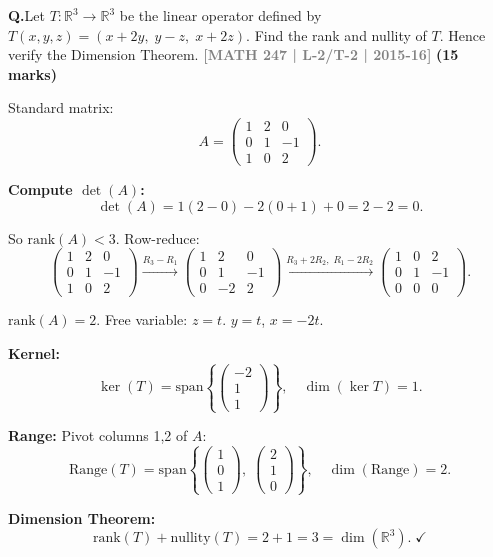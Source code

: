 \documentclass[12pt,a3paper]{article}
\newcommand{\yr}[1]{\hfill\textcolor{gray}{\small\textbf{[#1]}}}
\newcommand{\mk}[1]{\textcolor{orange!70!black}{\small\textbf{(#1 marks)}}}
\newcounter{qnum}
\newcommand{\Q}[1]{%
  \needspace{4\baselineskip}
  \refstepcounter{qnum}
  \vspace{6pt}
  \noindent\textbf{Q\theqnum.}\enspace #1\par
}
\begin{document}
\Q{Let $T: \mathbb{R}^3 \to \mathbb{R}^3$ be the linear operator defined by $T(x,y,z) = (x+2y,\; y-z,\; x+2z)$. Find the rank and nullity of $T$. Hence verify the Dimension Theorem.
\yr{MATH 247 | L-2/T-2 | 2015-16} \mk{15}}

\begin{tcolorbox}[enhanced,breakable,
  colback=cF!4,colframe=cF,boxrule=0.8pt,arc=5pt,
  title={\textbf{Answer --- $T(x,y,z)=(x+2y,\;y-z,\;x+2z)$: Rank, Nullity, Dimension Theorem}},
  fonttitle=\bfseries\color{white},colbacktitle=cF]

Standard matrix:
\[
A=\begin{pmatrix}1&2&0\\0&1&-1\\1&0&2\end{pmatrix}.
\]

\textbf{Compute $\det(A)$:}
\[
\det(A)=1(2-0)-2(0+1)+0=2-2=0.
\]

So $\mathrm{rank}(A)<3$. Row-reduce:
\[
\begin{pmatrix}1&2&0\\0&1&-1\\1&0&2\end{pmatrix}
\xrightarrow{R_3-R_1}
\begin{pmatrix}1&2&0\\0&1&-1\\0&-2&2\end{pmatrix}
\xrightarrow{R_3+2R_2,\;R_1-2R_2}
\begin{pmatrix}1&0&2\\0&1&-1\\0&0&0\end{pmatrix}.
\]

$\mathrm{rank}(A)=2$. Free variable: $z=t$. $y=t$, $x=-2t$.

\textbf{Kernel:}
\[
\ker(T)=\mathrm{span}\!\left\{\begin{pmatrix}-2\\1\\1\end{pmatrix}\right\},\quad\dim(\ker T)=1.
\]

\textbf{Range:} Pivot columns 1,2 of $A$:
\[
\mathrm{Range}(T)=\mathrm{span}\!\left\{\begin{pmatrix}1\\0\\1\end{pmatrix},\;\begin{pmatrix}2\\1\\0\end{pmatrix}\right\},\quad\dim(\mathrm{Range})=2.
\]

\textbf{Dimension Theorem:}
\[
\mathrm{rank}(T)+\mathrm{nullity}(T)=2+1=3=\dim(\mathbb{R}^3).\;\checkmark
\]

\end{tcolorbox}
\end{document}
